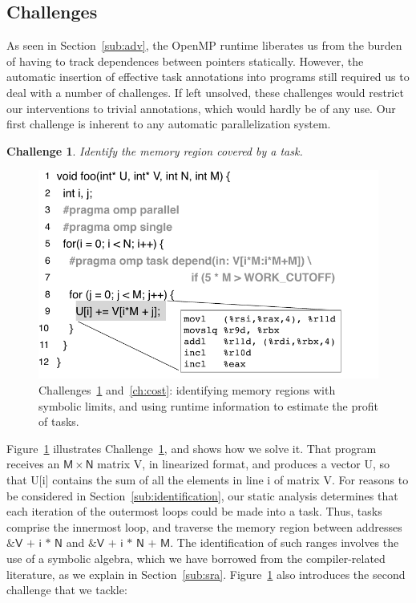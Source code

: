 \documentclass[sigplan,10pt,screen]{acmart}
\newtheorem{Challenge}{Challenge}[section]
\begin{document}
\subsection{Challenges}
\label{sub:dif}

As seen in Section~\ref{sub:adv}, the OpenMP runtime liberates us
from the burden of having to track dependences between pointers statically.
However, the automatic insertion of effective task annotations into
programs still required us to deal with a number of challenges.
If left unsolved, these challenges would restrict our interventions
to trivial annotations, which would hardly be of any use.
Our first challenge is inherent to any automatic parallelization system.

\begin{Challenge}
\label{ch:Regions}
Identify the memory region covered by a task.
\end{Challenge}

\begin{figure}[b!]
\begin{center}
\includegraphics[width=1\columnwidth]{images/ex_Regions}
\caption{Challenges~\ref{ch:Regions} and~\ref{ch:cost}: identifying memory regions
with symbolic limits, and using runtime information to estimate the profit of
tasks.}
\label{fig:ex_Regions}
\end{center}
\end{figure}

Figure~\ref{fig:ex_Regions} illustrates Challenge~\ref{ch:Regions}, and shows
how we solve it.
That program receives an $\mathsf{M}\times\mathsf{N}$ matrix \textsf{V}, in
linearized format, and produces a vector \textsf{U}, so that \textsf{U[i]}
contains the sum of all the elements in line \textsf{i} of matrix \textsf{V}.
For reasons to be considered in Section~\ref{sub:identification},
our static analysis determines that each iteration of the outermost loops
could be made into a task.
Thus, tasks comprise the innermost loop, and traverse the memory region
between addresses $\textsf{\&V + i * N}$ and $\textsf{\&V + i * N + M}$.
The identification of such ranges involves the use of a symbolic algebra,
which we have borrowed from the compiler-related literature, as we
explain in Section~\ref{sub:sra}.
Figure~\ref{fig:ex_Regions} also introduces the second challenge that we
tackle:
\end{document}
